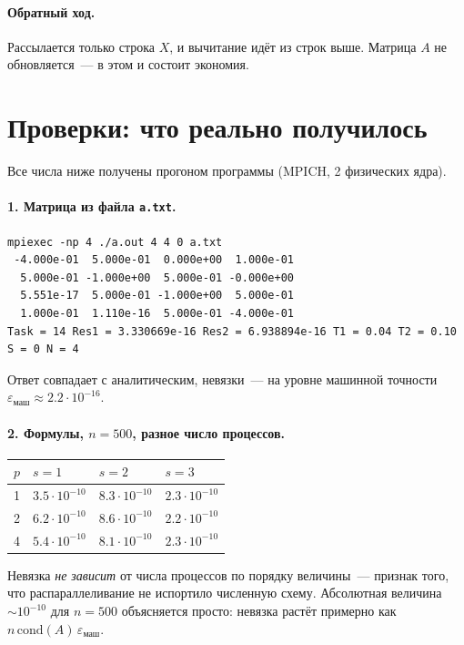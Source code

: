 \documentclass[11pt,a4paper]{report}
\begin{document}
\paragraph{Обратный ход.} Рассылается только строка $X$, и вычитание идёт из
строк выше. Матрица $A$ не обновляется~--- в этом и состоит экономия.

\section{Проверки: что реально получилось}

Все числа ниже получены прогоном программы (MPICH, 2 физических ядра).

\paragraph{1. Матрица из файла \texttt{a.txt}.}
\begin{lstlisting}[style=c]
mpiexec -np 4 ./a.out 4 4 0 a.txt
 -4.000e-01  5.000e-01  0.000e+00  1.000e-01
  5.000e-01 -1.000e+00  5.000e-01 -0.000e+00
  5.551e-17  5.000e-01 -1.000e+00  5.000e-01
  1.000e-01  1.110e-16  5.000e-01 -4.000e-01
Task = 14 Res1 = 3.330669e-16 Res2 = 6.938894e-16 T1 = 0.04 T2 = 0.10 S = 0 N = 4
\end{lstlisting}
Ответ совпадает с аналитическим, невязки~--- на уровне машинной точности
$\varepsilon_{\text{маш}}\approx2.2\cdot10^{-16}$.

\paragraph{2. Формулы, $n=500$, разное число процессов.}
\begin{center}
\begin{tabular}{llll}
\toprule
$p$ & $s=1$ & $s=2$ & $s=3$ \\
\midrule
1 & $3.5\cdot10^{-10}$ & $8.3\cdot10^{-10}$ & $2.3\cdot10^{-10}$ \\
2 & $6.2\cdot10^{-10}$ & $8.6\cdot10^{-10}$ & $2.2\cdot10^{-10}$ \\
4 & $5.4\cdot10^{-10}$ & $8.1\cdot10^{-10}$ & $2.3\cdot10^{-10}$ \\
\bottomrule
\end{tabular}
\end{center}
Невязка \emph{не зависит} от числа процессов по порядку величины~--- признак
того, что распараллеливание не испортило численную схему. Абсолютная величина
$\sim10^{-10}$ для $n=500$ объясняется просто: невязка растёт примерно как
$n\,\mathrm{cond}(A)\,\varepsilon_{\text{маш}}$.
\end{document}
